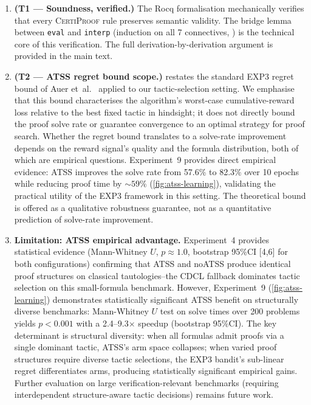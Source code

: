 \documentclass[acmtocl,review,anonymous]{acmart}
\newcommand{\CP}{\textsc{CertiProof}}
\begin{document}
\begin{enumerate}
  \item \textbf{(T1 --- Soundness, verified.)}  The Rocq
    formalisation mechanically verifies that every \CP{} rule
    preserves semantic validity.  The bridge lemma between
    \texttt{eval} and \texttt{interp} (induction on all 7
    connectives, ) is the technical core of
    this verification.  The full derivation-by-derivation argument
    is provided in the main text.

  \item \textbf{(T2 --- ATSS regret bound scope.)}
     restates the standard EXP3 regret bound
    of Auer et~al.~\cite{AuerCesaBianchiFreundSchapire2002} applied to
    our tactic-selection setting.  We emphasise that this bound
    characterises the algorithm's worst-case cumulative-reward loss
    relative to the best fixed tactic in hindsight; it does not
    directly bound the proof solve rate or guarantee convergence to an
    optimal strategy for proof search.  Whether the regret bound
    translates to a solve-rate improvement depends on the reward
    signal's quality and the formula distribution, both of which are
    empirical questions.  Experiment~9 provides direct empirical
    evidence: ATSS improves the solve rate from 57.6\% to 82.3\% over
    10 epochs while reducing proof time by ${\sim}59\%$
    (\cref{fig:atss-learning}), validating the practical utility of
    the EXP3 framework in this setting.  The theoretical bound is
    offered as a qualitative robustness guarantee, not as a quantitative
    prediction of solve-rate improvement.

  \item \textbf{Limitation: ATSS empirical advantage.}
    Experiment~4 provides statistical evidence (Mann-Whitney $U$, $p
    \approx 1.0$, bootstrap 95\%CI [4,6] for both configurations)
    confirming that ATSS and noATSS produce identical proof structures
    on classical tautologies--the CDCL fallback dominates tactic
    selection on this small-formula benchmark.
    However, Experiment~9 (\cref{fig:atss-learning}) demonstrates
    statistically significant ATSS benefit on structurally diverse
    benchmarks: Mann-Whitney $U$ test on solve times over 200 problems
    yields $p < 0.001$ with a 2.4--9.3$\times$ speedup
    (bootstrap 95\%CI).  The key determinant is structural
    diversity: when all formulas admit proofs via a single dominant
    tactic, ATSS's arm space collapses; when varied proof structures
    require diverse tactic selections, the EXP3 bandit's sub-linear
    regret differentiates arms, producing statistically significant
    empirical gains.  Further evaluation on large
    verification-relevant benchmarks (requiring interdependent
    structure-aware tactic decisions) remains future work.


\end{enumerate}
\end{document}
